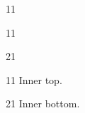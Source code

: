 \documentclass[paper=A4]{ropas-poster}
\begin{document}
\begin{postergrid}{1}{1}
\begin{posterblock}{1}{1}
\begin{postergrid}{2}{1}
\begin{posterblock}{1}{1}
Inner top.
\end{posterblock}
\begin{posterblock}{2}{1}
Inner bottom.
\end{posterblock}
\end{postergrid}
\end{posterblock}
\end{postergrid}
\end{document}
